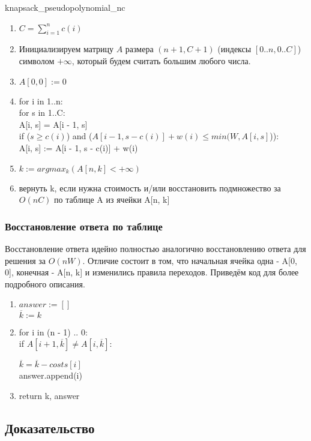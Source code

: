 \documentclass{article}
\begin{document}
	knapsack\_pseudopolynomial\_nc
	\begin{enumerate}
		\item $C = \sum\limits_{i = 1}^{n} {c(i)}$
		\item Инициализируем матрицу $A$ размера $(n + 1, C + 1)$ (индексы $[0..n, 0..C]$) символом $+\infty$, который будем считать большим любого числа.
		\item $A[0, 0] := 0$
		\item for i in 1..n: \\
			for s in 1..C: \\
			A[i, s] = A[i - 1, s] \\
			if ($s \geq c(i)$) and ($A[i - 1, s - c(i)] + w(i) \leq min(W, A[i, s]$)): \\
				A[i, s] := A[i - 1, s - c(i)] + w(i)
		\item $k := argmax_{k}(A[n, k] < +\infty)$
		\item вернуть k, если нужна стоимость и/или восстановить подмножество за $O(nC)$ по таблице A из ячейки A[n, k]
	\end{enumerate}
	
	\subsubsection{Восстановление ответа по таблице}
		
	Восстановление ответа идейно полностью аналогично восстановлению ответа для решения за $O(nW)$. Отличие состоит в том, что начальная ячейка одна - A[0, 0], конечная - A[n, k] и изменились правила переходов. Приведём код для более подробного описания.
	
	\begin{enumerate}
		\item $answer := []$ \\
			$\overline{k} := k$
		\item for i in (n - 1) .. 0: \\
			if $A[i + 1, \overline{k} ] \neq A[i, \overline{k} ]$:
			
				$\overline{k}  = \overline{k} - costs[i]$ \\
			answer.append(i)
		\item return k, answer
	\end{enumerate}	
	
	\subsection{Доказательство}
	
\end{document}
